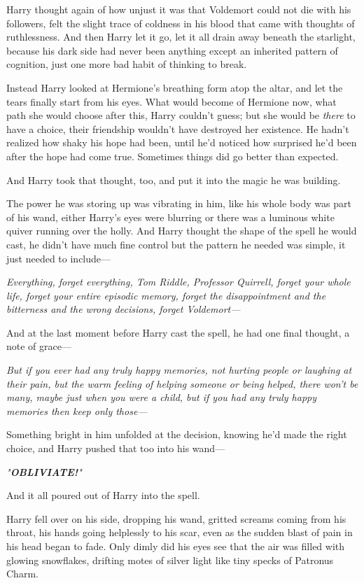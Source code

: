 Harry thought again of how unjust it was that Voldemort could not die with his
followers, felt the slight trace of coldness in his blood that came with
thoughts of ruthlessness. And then Harry let it go, let it all drain away
beneath the starlight, because his dark side had never been anything except an
inherited pattern of cognition, just one more bad habit of thinking to break.

Instead Harry looked at Hermione's breathing form atop the altar, and let the
tears finally start from his eyes. What would become of Hermione now, what path
she would choose after this, Harry couldn't guess; but she would be
\emph{there} to have a choice, their friendship wouldn't have destroyed her
existence. He hadn't realized how shaky his hope had been, until he'd noticed
how surprised he'd been after the hope had come true. Sometimes things did go
better than expected.

And Harry took that thought, too, and put it into the magic he was building.

The power he was storing up was vibrating in him, like his whole body was part
of his wand, either Harry's eyes were blurring or there was a luminous white
quiver running over the holly. And Harry thought the shape of the spell he
would cast, he didn't have much fine control but the pattern he needed was
simple, it just needed to include---

\emph{Everything, forget everything, Tom Riddle, Professor Quirrell, forget
your whole life, forget your entire episodic memory, forget the disappointment
and the bitterness and the wrong decisions, forget Voldemort---}

And at the last moment before Harry cast the spell, he had one final thought, a
note of grace---

\emph{But if you ever had any truly happy memories, not hurting people or
laughing at their pain, but the warm feeling of helping someone or being
helped, there won't be many, maybe just when you were a child, but if you had
any truly happy memories then keep only those---}

Something bright in him unfolded at the decision, knowing he'd made the right
choice, and Harry pushed that too into his wand---

\emph{"\textbf{OBLIVIATE!}"}

And it all poured out of Harry into the spell.

Harry fell over on his side, dropping his wand, gritted screams coming from his
throat, his hands going helplessly to his scar, even as the sudden blast of
pain in his head began to fade. Only dimly did his eyes see that the air was
filled with glowing snowflakes, drifting motes of silver light like tiny specks
of Patronus Charm.

